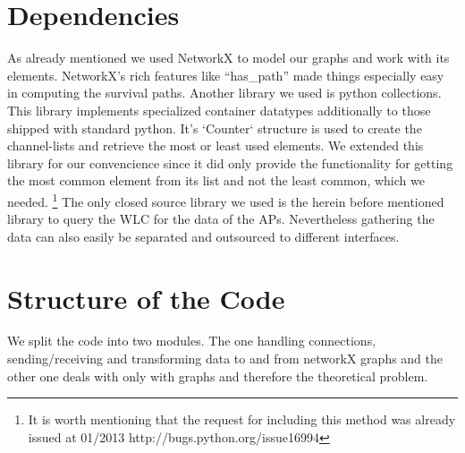 \section{Dependencies}
  As already mentioned we used NetworkX\cite{hagberg-2008-exploring} to model our graphs and work with its elements.
  NetworkX's rich features like ``has\_path'' made things especially easy in computing the survival paths.
  Another library we used is python collections. \cite{python_collections}
  This library implements specialized container datatypes additionally to those shipped with standard python.
  It's `Counter` structure is used to create the channel-lists and retrieve the most or least used elements.
  We extended this library for our convencience since it did only provide the functionality for getting the most common element from its list and not the least common,
  which we needed. \footnote{It is worth mentioning that the request for including this method was already issued at 01/2013 http://bugs.python.org/issue16994}
  The only closed source library we used is the herein before mentioned library to query the WLC for the data of the APs. Nevertheless gathering the data can also
  easily be separated and outsourced to different interfaces.
\section{Structure of the Code}
  We split the code into two modules. The one handling connections, sending/receiving and transforming data to and from networkX graphs and the other one 
  deals with only with graphs and therefore the theoretical problem.
